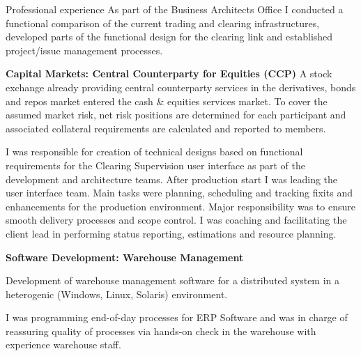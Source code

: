 \begin{rubric}{Professional experience}
As part of the Business Architects Office I conducted a functional comparison of the current trading and clearing infrastructures, developed parts of the functional design for the clearing link and established project/issue management processes.

\entry*[12/2001 - 06/2003] \textbf{Capital Markets: Central Counterparty for Equities (CCP)}\newline
{} 
A stock exchange already providing central counterparty services in the derivatives, bonds and repos market entered the cash \& equities services market. To cover the assumed market risk, net risk positions are determined for each participant and associated collateral requirements are calculated and reported to members. 

I was responsible for creation of technical designs based on functional requirements for the Clearing Supervision user interface as part of the development and architecture teams.
After production start I was leading the user interface team. Main tasks were planning, scheduling and tracking fixits and enhancements for the production environment. Major responsibility was to ensure smooth delivery processes and scope control. I was coaching and facilitating the client lead in performing status reporting,
estimations and resource planning.


\entry*[01/2001 - 10/2001] \textbf{Software Development: Warehouse Management}\newline

Development of warehouse management software for a distributed system in a heterogenic (Windows, Linux, Solaris) environment.

I was programming end-of-day processes for ERP Software and was in charge of reassuring quality of processes via hands-on check in the warehouse with experience warehouse staff.





\end{rubric}
